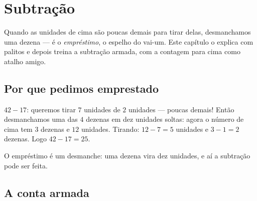\chapter{Subtração}\label{ch:g2:subtraction}

Quando as unidades de cima são poucas demais para tirar delas,
desmanchamos uma dezena --- é o \emph{empréstimo}, o espelho do
vai-um. Este capítulo o explica com palitos e depois treina a
subtração armada, com a contagem para cima como atalho amigo.

\section{Por que pedimos emprestado}

\begin{example}\label{ex:g2:subtraction:unbundle}
$42 - 17$: queremos tirar $7$ unidades de $2$ unidades --- poucas
demais! Então desmanchamos uma das $4$ dezenas em dez unidades
soltas: agora o número de cima tem $3$ dezenas e $12$ unidades.
Tirando: $12 - 7 = 5$ unidades e $3 - 1 = 2$ dezenas. Logo
$42 - 17 = 25$.
\end{example}

\begin{omfigure}

{\small O empréstimo é um desmanche: uma dezena vira dez unidades, e
aí a subtração pode ser feita.}
\end{omfigure}

\section{A conta armada}

